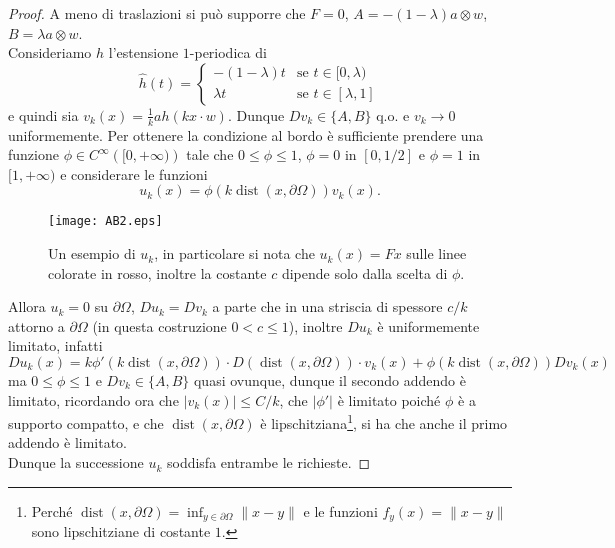 \documentclass[a4paper,11pt]{book}
\theoremstyle{plain}
\theoremstyle{definition}
\theoremstyle{remark}
\newcommand{\norm}[1]{\lVert#1\rVert}
\DeclareMathOperator{\dist}{dist}
\begin{document}
\begin{proof}
	A meno di traslazioni si può supporre che $F=0$, $A=-(1-\lambda)a\otimes w$, $B=\lambda a\otimes w$.\\
	Consideriamo $h$ l'estensione $1$-periodica di
	\[
		\hat{h}(t) = \begin{cases}
		       	-(1-\lambda)t&\text{se }t\in [0,\lambda)\\
		       	\lambda t&\text{se }t\in[\lambda,1]
		       \end{cases}
	\]
	e quindi sia $\displaystyle v_k(x) = \frac{1}{k}ah(kx\cdot w)$. Dunque $Dv_k\in\{A,B\}$ q.o. e $v_k\to 0$ uniformemente. Per ottenere la condizione al bordo è sufficiente prendere una funzione $\phi\in C^{\infty}\left([0,+\infty)\right)$ tale che $0\leq \phi\leq 1$, $\phi=0$ in $[0,1/2]$ e $\phi=1$ in $[1,+\infty)$ e considerare le funzioni
	\[
		u_k(x) = \phi(k\dist(x,\partial \Omega))v_k(x).
	\]
	\begin{figure}[H]
		\begin{minipage}[c]{0.68\textwidth}
			\texttt{[image: AB2.eps]}
		\end{minipage}\hfill
		\begin{minipage}[c]{0.32\textwidth}
			\caption{Un esempio di $u_k$, in particolare si nota che $u_k(x) = Fx$ sulle linee colorate in rosso, inoltre la costante $c$ dipende solo dalla scelta di $\phi$.}
			\label{fig:3}
		\end{minipage}
	\end{figure}
	
	
	Allora $u_k=0$ su $\partial\Omega$, $Du_k = Dv_k$ a parte che in una striscia di spessore $c/k$ attorno a $\partial\Omega$ (in questa costruzione $0< c\leq 1$), inoltre $Du_k$ è uniformemente limitato, infatti
	\[
		Du_k(x) = k\phi'(k\dist(x,\partial\Omega))\cdot D(\dist(x,\partial\Omega))\cdot v_k(x) + \phi(k\dist(x,\partial\Omega))Dv_k(x)
	\]
	ma $0\leq\phi\leq 1$ e $Dv_k\in\{A,B\}$ quasi ovunque, dunque il secondo addendo è limitato, ricordando ora che $|v_k(x)| \leq C/k$, che $|\phi'|$ è limitato poiché $\phi$ è a supporto compatto, e che $\dist(x,\partial \Omega)$ è lipschitziana\footnote{Perché $\displaystyle\dist(x,\partial\Omega) = \inf_{y\in\partial\Omega}\norm{x-y}$ e le funzioni $f_y(x) = \norm{x-y}$ sono lipschitziane di costante $1$.}, si ha che anche il primo addendo è limitato.\\
	Dunque la successione $u_k$ soddisfa entrambe le richieste.
\end{proof}
\end{document}

